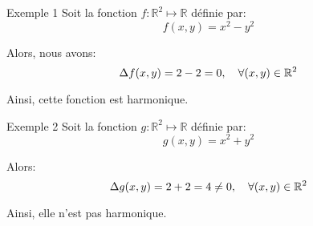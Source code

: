 \documentclass[a4paper]{article}
\begin{document}
\begin{parag}{Exemple 1}
    Soit la fonction $f: \mathbb{R}^2 \mapsto \mathbb{R}$ définie par: 
    \[f\left(x, y\right) = x^2 - y^2\]
    
    Alors, nous avons: 
    \[\Delta f\left(x, y\right) = 2 - 2 = 0, \mathspace \forall \left(x, y\right) \in \mathbb{R}^2\]

    Ainsi, cette fonction est harmonique.

\end{parag}

\begin{parag}{Exemple 2}
    Soit la fonction $g: \mathbb{R}^2 \mapsto \mathbb{R}$ définie par: 
    \[g\left(x, y\right) = x^2 + y^2\]
    
    Alors: 
    \[\Delta g\left(x, y\right) = 2 + 2 = 4 \neq 0, \mathspace \forall \left(x, y\right) \in \mathbb{R}^2\]
    
    Ainsi, elle n'est pas harmonique.

\end{parag}
\end{document}
